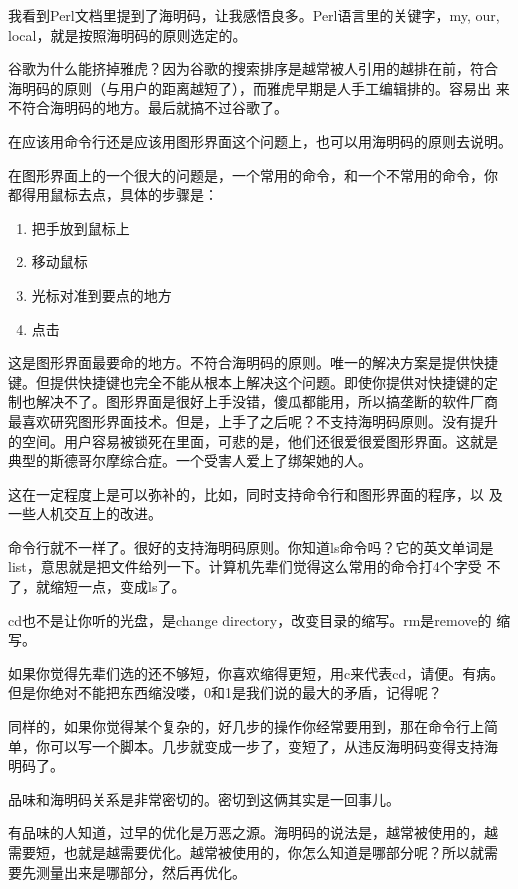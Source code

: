 \documentclass[10pt]{article}
\begin{document}
\begin{CJK*}{UTF8}{simhei}
我看到Perl文档里提到了海明码，让我感悟良多。Perl语言里的关键字，my,
our, local，就是按照海明码的原则选定的。

谷歌为什么能挤掉雅虎？因为谷歌的搜索排序是越常被人引用的越排在前，符合
海明码的原则（与用户的距离越短了），而雅虎早期是人手工编辑排的。容易出
来不符合海明码的地方。最后就搞不过谷歌了。

在应该用命令行还是应该用图形界面这个问题上，也可以用海明码的原则去说明。

在图形界面上的一个很大的问题是，一个常用的命令，和一个不常用的命令，你
都得用鼠标去点，具体的步骤是：

\begin{enumerate}
\item 把手放到鼠标上
\item 移动鼠标
\item 光标对准到要点的地方
\item 点击
\end{enumerate}

这是图形界面最要命的地方。不符合海明码的原则。唯一的解决方案是提供快捷
键。但提供快捷键也完全不能从根本上解决这个问题。即使你提供对快捷键的定
制也解决不了。图形界面是很好上手没错，傻瓜都能用，所以搞垄断的软件厂商
最喜欢研究图形界面技术。但是，上手了之后呢？不支持海明码原则。没有提升
的空间。用户容易被锁死在里面，可悲的是，他们还很爱很爱图形界面。这就是
典型的斯德哥尔摩综合症。一个受害人爱上了绑架她的人。

这在一定程度上是可以弥补的，比如，同时支持命令行和图形界面的程序，以
及一些人机交互上的改进。

命令行就不一样了。很好的支持海明码原则。你知道ls命令吗？它的英文单词是
list，意思就是把文件给列一下。计算机先辈们觉得这么常用的命令打4个字受
不了，就缩短一点，变成ls了。

cd也不是让你听的光盘，是change directory，改变目录的缩写。rm是remove的
缩写。

如果你觉得先辈们选的还不够短，你喜欢缩得更短，用c来代表cd，请便。有病。
但是你绝对不能把东西缩没喽，0和1是我们说的最大的矛盾，记得呢？

同样的，如果你觉得某个复杂的，好几步的操作你经常要用到，那在命令行上简
单，你可以写一个脚本。几步就变成一步了，变短了，从违反海明码变得支持海
明码了。

品味和海明码关系是非常密切的。密切到这俩其实是一回事儿。

有品味的人知道，过早的优化是万恶之源。海明码的说法是，越常被使用的，越
需要短，也就是越需要优化。越常被使用的，你怎么知道是哪部分呢？所以就需
要先测量出来是哪部分，然后再优化。


\end{CJK*}
\end{document}
